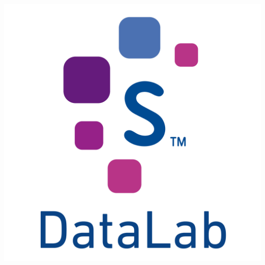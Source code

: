 \documentclass[a0,portrait]{a0poster}
\begin{document}
\begin{minipage}[b]{0.12\linewidth}
\includegraphics[width=\textwidth]{DataLab-Logo-Alta.png}\\
\end{minipage}

\vspace{3.5cm} %

\end{document}
